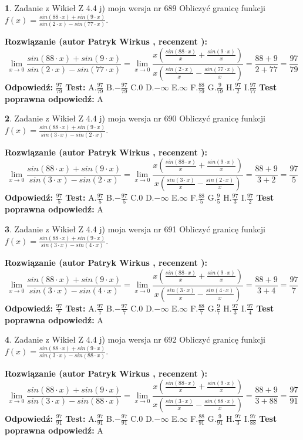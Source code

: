 \documentclass[12pt, a4paper]{article}
\theoremstyle{definition} %
\newtheorem{zad}{}
\newcommand{\zadStart}[1]{\begin{zad}#1\newline}
\newcommand{\zadStop}{\end{zad}}
\newcommand{\rozwStart}[2]{\noindent \textbf{Rozwiązanie (autor #1 , recenzent #2): }\newline}
\newcommand{\rozwStop}{\newline}
\newcommand{\odpStart}{\noindent \textbf{Odpowiedź:}\newline}
\newcommand{\odpStop}{\newline}
\newcommand{\testStart}{\noindent \textbf{Test:}\newline}
\newcommand{\testStop}{\newline}
\newcommand{\kluczStart}{\noindent \textbf{Test poprawna odpowiedź:}\newline}
\newcommand{\kluczStop}{\newline}
\begin{document}
\zadStart{Zadanie z Wikieł Z 4.4 j) moja wersja nr 689}
Obliczyć granicę funkcji $f(x)=\frac{sin(88\cdot x) +sin(9\cdot x)}{sin(2\cdot x) -sin(77\cdot x)}$.
\zadStop
\rozwStart{Patryk Wirkus}{}
$$\lim\limits_{x\to 0}\frac{sin(88\cdot x) +sin(9\cdot x)}{sin(2\cdot x) -sin(77\cdot x)}=\lim\limits_{x\to 0}\frac{x(\frac{sin(88\cdot x)}{x}+\frac{sin(9\cdot x)}{x})}{x(\frac{sin(2\cdot x)}{x}-\frac{sin(77\cdot x)}{x})}=\frac{88+9}{2+77} = \frac{97}{79}$$
\rozwStop
\odpStart
$\frac{97}{79}$
\odpStop
\testStart
A.$\frac{97}{79}$
B.$-\frac{97}{79}$
C.$0$
D.$-\infty$
E.$\infty$
F.$\frac{88}{79}$
G.$\frac{9}{79}$
H.$\frac{97}{2}$
I.$\frac{97}{77}$
\testStop
\kluczStart
A
\kluczStop



\zadStart{Zadanie z Wikieł Z 4.4 j) moja wersja nr 690}
Obliczyć granicę funkcji $f(x)=\frac{sin(88\cdot x) +sin(9\cdot x)}{sin(3\cdot x) -sin(2\cdot x)}$.
\zadStop
\rozwStart{Patryk Wirkus}{}
$$\lim\limits_{x\to 0}\frac{sin(88\cdot x) +sin(9\cdot x)}{sin(3\cdot x) -sin(2\cdot x)}=\lim\limits_{x\to 0}\frac{x(\frac{sin(88\cdot x)}{x}+\frac{sin(9\cdot x)}{x})}{x(\frac{sin(3\cdot x)}{x}-\frac{sin(2\cdot x)}{x})}=\frac{88+9}{3+2} = \frac{97}{5}$$
\rozwStop
\odpStart
$\frac{97}{5}$
\odpStop
\testStart
A.$\frac{97}{5}$
B.$-\frac{97}{5}$
C.$0$
D.$-\infty$
E.$\infty$
F.$\frac{88}{5}$
G.$\frac{9}{5}$
H.$\frac{97}{3}$
I.$\frac{97}{2}$
\testStop
\kluczStart
A
\kluczStop



\zadStart{Zadanie z Wikieł Z 4.4 j) moja wersja nr 691}
Obliczyć granicę funkcji $f(x)=\frac{sin(88\cdot x) +sin(9\cdot x)}{sin(3\cdot x) -sin(4\cdot x)}$.
\zadStop
\rozwStart{Patryk Wirkus}{}
$$\lim\limits_{x\to 0}\frac{sin(88\cdot x) +sin(9\cdot x)}{sin(3\cdot x) -sin(4\cdot x)}=\lim\limits_{x\to 0}\frac{x(\frac{sin(88\cdot x)}{x}+\frac{sin(9\cdot x)}{x})}{x(\frac{sin(3\cdot x)}{x}-\frac{sin(4\cdot x)}{x})}=\frac{88+9}{3+4} = \frac{97}{7}$$
\rozwStop
\odpStart
$\frac{97}{7}$
\odpStop
\testStart
A.$\frac{97}{7}$
B.$-\frac{97}{7}$
C.$0$
D.$-\infty$
E.$\infty$
F.$\frac{88}{7}$
G.$\frac{9}{7}$
H.$\frac{97}{3}$
I.$\frac{97}{4}$
\testStop
\kluczStart
A
\kluczStop



\zadStart{Zadanie z Wikieł Z 4.4 j) moja wersja nr 692}
Obliczyć granicę funkcji $f(x)=\frac{sin(88\cdot x) +sin(9\cdot x)}{sin(3\cdot x) -sin(88\cdot x)}$.
\zadStop
\rozwStart{Patryk Wirkus}{}
$$\lim\limits_{x\to 0}\frac{sin(88\cdot x) +sin(9\cdot x)}{sin(3\cdot x) -sin(88\cdot x)}=\lim\limits_{x\to 0}\frac{x(\frac{sin(88\cdot x)}{x}+\frac{sin(9\cdot x)}{x})}{x(\frac{sin(3\cdot x)}{x}-\frac{sin(88\cdot x)}{x})}=\frac{88+9}{3+88} = \frac{97}{91}$$
\rozwStop
\odpStart
$\frac{97}{91}$
\odpStop
\testStart
A.$\frac{97}{91}$
B.$-\frac{97}{91}$
C.$0$
D.$-\infty$
E.$\infty$
F.$\frac{88}{91}$
G.$\frac{9}{91}$
H.$\frac{97}{3}$
I.$\frac{97}{88}$
\testStop
\kluczStart
A
\kluczStop
\end{document}
